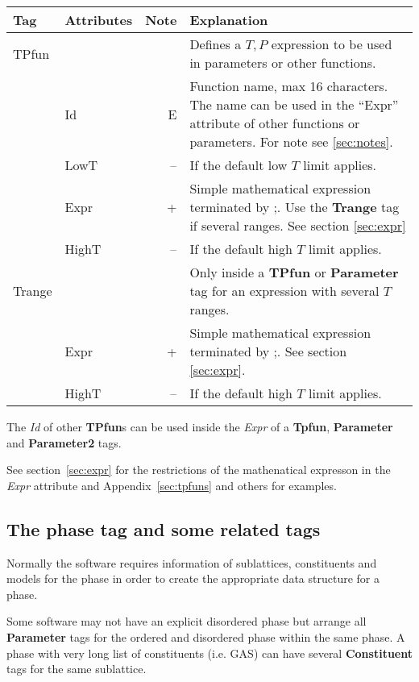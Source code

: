 \documentclass{article}
\begin{document}
\bigskip
\begin{tabular}{|p{} p{} r p{}|}\hline
  Tag & Attributes & Note & Explanation\\\hline

  TPfun & && Defines a $T, P$ expression to be used in parameters or other functions.\\
        & Id & E & Function name, max 16 characters. The name can be used in the ``Expr'' attribute of other functions or parameters.  For note see \ref{sec:notes}.\\
        & LowT & -- & If the default low $T$ limit applies.\\
        & Expr & + & Simple mathematical expression terminated by ;.   Use the {\bf Trange} tag if several ranges.  See section \ref{sec:expr}\\
        & HighT & -- & If the default high $T$ limit applies.\\\hline

  Trange & && Only inside a {\bf TPfun} or {\bf Parameter} tag for an expression with several $T$ ranges.\\ 
         & Expr & + & Simple mathematical expression terminated by ;.  See section \ref{sec:expr}.\\
         & HighT & -- & If the default high $T$ limit applies.\\\hline
\end{tabular}

\bigskip
The {\em Id} of other {\bf TPfun}s can be used inside the {\em Expr}
of a {\bf Tpfun}, {\bf Parameter} and {\bf Parameter2} tags.

See section~\ref{sec:expr} for the restrictions of the mathenatical
expresson in the {\em Expr} attribute and Appendix~\ref{sec:tpfuns}
and others for examples.

\newpage 

\subsection{The phase tag and some related tags}\label{sec:phase}

Normally the software requires information of sublattices,
constituents and models for the phase in order to create the
appropriate data structure for a phase.

Some software may not have an explicit disordered phase but arrange
all {\bf Parameter} tags for the ordered and disordered phase within
the same phase.  A phase with very long list of constituents
(i.e. GAS) can have several {\bf Constituent} tags for the same
sublattice.
\end{document}
